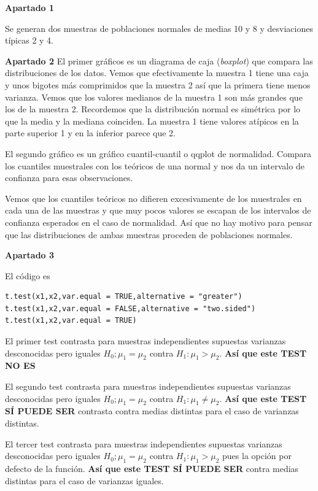\documentclass[
]{article}
\begin{document}
\textbf{Apartado 1}

Se generan dos muestras de poblaciones normales de medias 10 y 8 y
desviaciones típicas 2 y 4.

\textbf{Apartado 2} El primer gráficos es un diagrama de caja
(\emph{boxplot}) que compara las distribuciones de los datos. Vemos que
efectivamente la muestra 1 tiene una caja y unos bigotes más comprimidos
que la muestra 2 así que la primera tiene menos varianza. Vemos que los
valores medianos de la muestra 1 son más grandes que los de la muestra
2. Recordemos que la distribución normal es simétrica por lo que la
media y la mediana coinciden. La muestra 1 tiene valores atípicos en la
parte superior 1 y en la inferior parece que 2.

El segundo gráfico es un gráfico cuantil-cuantil o qqplot de normalidad.
Compara los cuantiles muestrales con los teóricos de una normal y nos da
un intervalo de confianza para esas observaciones.

Vemos que los cuantiles teóricos no difieren excesivamente de los
muestrales en cada una de las muestras y que muy pocos valores se
escapan de los intervalos de confianza esperados en el caso de
normalidad. Así que no hay motivo para pensar que las distribuciones de
ambas muestras proceden de poblaciones normales.

\textbf{Apartado 3}

El código es

\begin{verbatim}
t.test(x1,x2,var.equal = TRUE,alternative = "greater")
t.test(x1,x2,var.equal = FALSE,alternative = "two.sided")
t.test(x1,x2,var.equal = TRUE)
\end{verbatim}

El primer test contrasta para muestras independientes supuestas
varianzas desconocidas pero iguales \(H_0;\mu_1=\mu_2\) contra
\(H_1:\mu_1>\mu_2\). \textbf{Así que este TEST NO ES}

El segundo test contrasta para muestras independientes supuestas
varianzas desconocidas pero iguales \(H_0;\mu_1=\mu_2\) contra
\(H_1:\mu_1\not=\mu_2\). \textbf{Así que este TEST SÍ PUEDE SER}
contrasta contra medias distintas para el caso de varianzas distintas.

El tercer test contrasta para muestras independientes supuestas
varianzas desconocidas pero iguales \(H_0;\mu_1=\mu_2\) contra
\(H_1:\mu_1>\mu_2\) pues la opción por defecto de la función.
\textbf{Así que este TEST SÍ PUEDE SER} contra medias distintas para el
caso de varianzas iguales.
\end{document}
